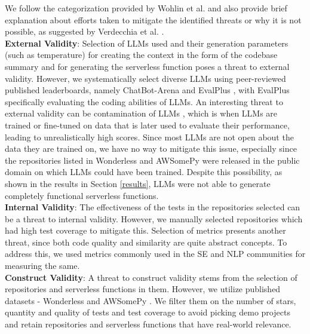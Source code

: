 We follow the categorization provided by Wohlin et al. \cite{wohlin2012experimentation} and also provide brief explanation about efforts taken to mitigate the identified threats or why it is not possible, as suggested by Verdecchia et al. \cite{verdecchia_threats}. \\
    \textbf{External Validity}: Selection of LLMs used and their generation parameters (such as temperature) for creating the context in the form of the codebase summary and for generating the serverless function poses a threat to external validity. However, we systematically select diverse LLMs using peer-reviewed published leaderboards, namely ChatBot-Arena \cite{chiang2024chatbotarenaopenplatform} and EvalPlus \cite{liu2024code_evalplus}, with EvalPlus specifically evaluating the coding abilities of LLMs. 
    An interesting threat to external validity can be contamination of LLMs \cite{dong2024contamination}, which is when LLMs are trained or fine-tuned on data that is later used to evaluate their performance, leading to unrealistically high scores. Since most LLMs are not open about the data they are trained on, we have no way to mitigate this issue, especially since the repositories listed in Wonderless and AWSomePy were released in the public domain on which LLMs could have been trained. Despite this possibility, as shown in the results in Section \ref{results}, LLMs were not able to generate completely functional serverless functions. \\
    \textbf{Internal Validity}: 
    The effectiveness of the tests in the repositories selected can be a threat to internal validity. However, we manually selected repositories which had high test coverage to mitigate this. 
    Selection of metrics presents another threat, since both code quality and similarity are quite abstract concepts. To address this, we used metrics commonly used in the SE and NLP communities for measuring the same. \\
    \textbf{Construct Validity}: 
    A threat to construct validity stems from the selection of repositories and serverless functions in them. However, we utilize published datasets - Wonderless \cite{eskandani2021wonderless} and AWSomePy \cite{giuseppe_awsomepy}. We filter them on the number of stars, quantity and quality of tests and test coverage to avoid picking demo projects and retain repositories and serverless functions that have real-world relevance. 
